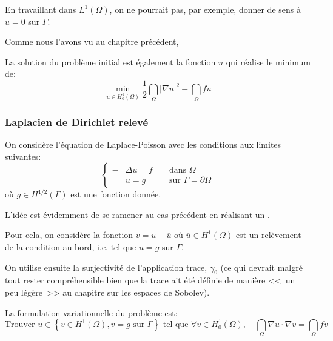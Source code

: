 En travaillant dans $L^1(\Omega)$, on ne pourrait pas, par exemple, donner de sens
à $u = 0$ sur $\Gamma$.

\medskip
Comme nous l'avons vu au chapitre précédent, 

La solution du problème initial est également la fonction $u$ qui réalise
le minimum de:
\begin{equation}
\min_{u\in H^1_0(\Omega)} \dfrac12\dint_\Omega |\nabla u|^2-\dint_\Omega fu
\end{equation}

\medskip
\subsubsection{Laplacien de Dirichlet relevé}
On considère l'équation de Laplace-Poisson avec les conditions aux limites suivantes:
\begin{equation}\left\{\begin{aligned}
-&\Delta u=f &&\text{ dans } \Omega\\
&u=g &&\text{ sur } \Gamma=\partial\Omega
\end{aligned}
\right.
\end{equation}
où $g\in H^{1/2}(\Gamma)$ est une fonction donnée.

\medskip
L'idée est évidemment de se ramener au cas précédent en réalisant un
.

Pour cela, on considère la fonction $v = u - \overline{u}$ où
$\overline{u}\in H^1(\Omega)$ est un relèvement de la condition
au bord, i.e. tel que $\overline{u}=g$ sur $\Gamma$.

On utilise ensuite la surjectivité de l'application trace, $\gamma_0$ (ce qui
devrait malgré tout rester compréhensible bien que la trace ait été définie
de manière <<~un peu légère~>> au chapitre sur les espaces de
Sobolev).

\medskip
La formulation variationnelle du problème est:
\begin{equation}
\text{Trouver }u\in \left\{ v\in H^1(\Omega), v=g \text{ sur } \Gamma\right\}
 \text{ tel que }
\forall v\in H^1_0(\Omega),
\quad\dint_\Omega \nabla u\cdot\nabla v  =  \dint_\Omega fv
\end{equation}

